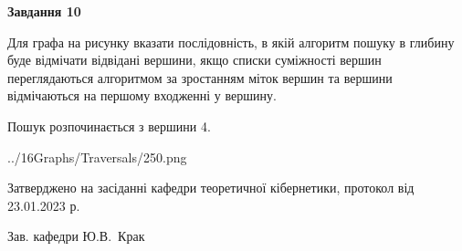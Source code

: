 \documentclass[12pt, ukrainian]{article}
\begin{document}
{\begin {large}
{\begin {center}\textbf{Завдання 10}\end {center}}\par
Для графа на рисунку вказати послідовність, в якій алгоритм пошуку в глибину буде відмічати відвідані вершини, якщо списки суміжності вершин переглядаються алгоритмом за зростанням міток вершин та вершини відмічаються на першому вход\-женні у вершину.\par
Пошук розпочинається з вершини 4.\par

\begin{center}
	{../16Graphs/Traversals/250.png}
\end{center}\par
\newpage


\end {large}
}
{\smallskip \begin {small} Затверджено на засіданні кафедри теоретичної кібернетики, протокол  від   23.01.2023 р.\par\smallskip\smallskip
{\parbox {6.5 cm}{Зав. кафедри \dotfill Ю.В.~Крак}} \end{small}}
\end{document}
